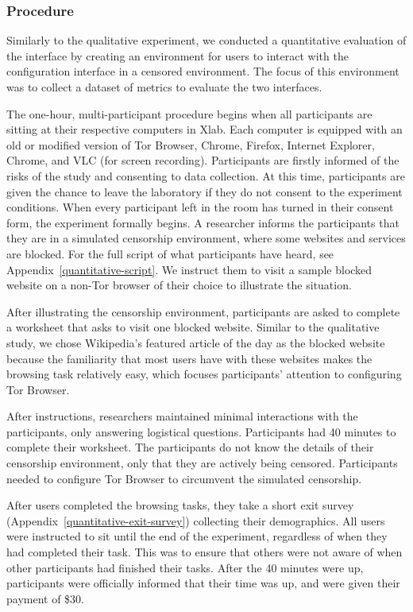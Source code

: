 \documentclass[USenglish,oneside,twocolumn]{article}
\begin{document}
\subsubsection{Procedure}
Similarly to the qualitative experiment, we conducted a quantitative evaluation 
of the interface by creating an environment  for users to interact with the 
configuration interface in a censored environment. The focus of this environment 
was to collect a dataset of metrics to evaluate the two interfaces. 

The one-hour, multi-participant procedure begins when all participants are sitting at their
respective computers in Xlab. Each computer is equipped with an old or modified version
of Tor Browser, Chrome, Firefox, Internet Explorer,  Chrome, and VLC (for screen recording). 
Participants are firstly informed of the risks of the study and consenting to data collection.  At
this time, participants are given the chance to leave the laboratory if they do not consent to 
the experiment conditions. When every participant left in the room has turned in their consent
form, the experiment formally begins. A researcher informs the participants that they are in a
simulated censorship environment, where some websites and services are blocked. 
For the full script of what participants have heard, see Appendix~\ref{quantitative-script}. We
instruct them to visit a sample blocked website on a non-Tor browser of their choice to illustrate 
the situation.

After illustrating the censorship environment, participants are asked to 
complete a worksheet that asks to visit one blocked website. 
Similar to the qualitative study, we chose Wikipedia's featured article of the day 
as the blocked website because the familiarity 
that most users have with these websites makes the browsing task relatively easy, 
which focuses participants' attention to configuring Tor Browser. 

After instructions, researchers maintained minimal interactions with the participants, 
only answering logistical questions. Participants had
40 minutes to complete their worksheet. 
The participants do not know the details of their censorship environment,
only that they are actively being censored. Participants needed to configure Tor Browser to 
circumvent the simulated censorship. 

After users completed the browsing tasks, they take a short exit survey (Appendix~\ref{quantitative-exit-survey})
collecting their demographics. All users were instructed to sit until the end of the experiment,
regardless of when they had completed their task. This was to ensure that others were not 
aware of when other participants had finished their tasks. After the 40 minutes were up, 
participants were officially informed that their time was up, and were given their payment of 
\$30. 
\end{document}
